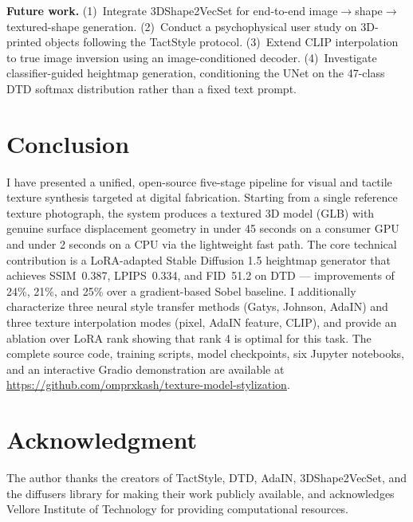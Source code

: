 \documentclass[conference]{IEEEtran}
\begin{document}
\textbf{Future work.} (1)~Integrate 3DShape2VecSet \cite{b12} for end-to-end
image$\to$shape$\to$textured-shape generation. (2)~Conduct a psychophysical
user study on 3D-printed objects following the TactStyle \cite{b1} protocol.
(3)~Extend CLIP interpolation to true image inversion using an image-conditioned
decoder. (4)~Investigate classifier-guided heightmap generation, conditioning
the UNet on the 47-class DTD softmax distribution rather than a fixed text prompt.

\section{Conclusion}

I have presented a unified, open-source five-stage pipeline for visual and
tactile texture synthesis targeted at digital fabrication. Starting from a
single reference texture photograph, the system produces a textured 3D model
(GLB) with genuine surface displacement geometry in under 45 seconds on a
consumer GPU and under 2 seconds on a CPU via the lightweight fast path.
The core technical contribution is a LoRA-adapted Stable Diffusion 1.5
heightmap generator that achieves SSIM~0.387, LPIPS~0.334, and FID~51.2
on DTD — improvements of 24\%, 21\%, and 25\% over a gradient-based
Sobel baseline. I additionally characterize three neural style transfer
methods (Gatys, Johnson, AdaIN) and three texture interpolation modes
(pixel, AdaIN feature, CLIP), and provide an ablation over LoRA rank showing
that rank 4 is optimal for this task. The complete source code, training
scripts, model checkpoints, six Jupyter notebooks, and an interactive
Gradio demonstration are available at
\url{https://github.com/omprxkash/texture-model-stylization}.

\section*{Acknowledgment}

The author thanks the creators of TactStyle, DTD, AdaIN, 3DShape2VecSet,
and the diffusers library for making their work publicly available, and
acknowledges Vellore Institute of Technology for providing computational
resources.
\end{document}
